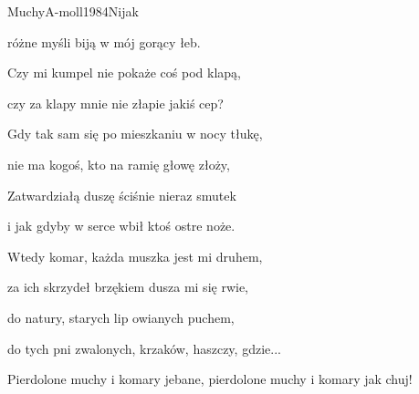 \begin{song}{Muchy}{A-moll}{1984}{Nijak}{}{}
\begin{SBVerse}
    różne myśli biją w mój gorący łeb.

    Czy mi kumpel nie pokaże coś pod klapą,

    czy za klapy mnie nie złapie jakiś cep?
  \end{SBVerse}
  \begin{SBVerse}
    Gdy tak sam się po mieszkaniu w nocy tłukę,

    nie ma kogoś, kto na ramię głowę złoży,

    Zatwardziałą duszę ściśnie nieraz smutek

    i jak gdyby w serce wbił ktoś ostre noże.
  \end{SBVerse}
  \begin{SBVerse}
    Wtedy komar, każda muszka jest mi druhem,

    za ich skrzydeł brzękiem dusza mi się rwie,

    do natury, starych lip owianych puchem,

    do tych pni zwalonych, krzaków, haszczy, gdzie...
  \end{SBVerse}

  \begin{SBChorus}
    Pierdolone muchy i komary jebane, pierdolone muchy i komary jak chuj!
  \end{SBChorus}
\end{song}
